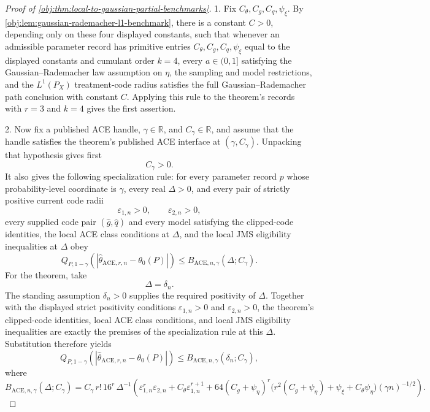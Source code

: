 \begin{proof}[Proof of \cref{obj:thm:local-to-gaussian-partial-benchmarks}]
1.  Fix \(C_{\theta},C_g,C_q,\psi_{\xi}\).  By
\cref{obj:lem:gaussian-rademacher-l1-benchmark}, there is a constant
\(C>0\), depending only on these four displayed constants, such that whenever
an admissible parameter record has primitive entries
\(C_{\theta},C_g,C_q,\psi_{\xi}\) equal to the displayed constants and
cumulant order \(k=4\), every \(a\in(0,1]\) satisfying the
Gaussian--Rademacher law assumption on \(\eta\), the sampling and model
restrictions, and the \(L^1(P_X)\) treatment-code radius satisfies the full
Gaussian--Rademacher path conclusion with constant \(C\).  Applying this rule
to the theorem's records with \(r=3\) and \(k=4\) gives the first assertion. %

2.  Now fix a published ACE handle, \(\gamma\in\mathbb R\), and
\(C_{\gamma}\in\mathbb R\), and assume that the handle satisfies the theorem's
published ACE interface at \((\gamma,C_{\gamma})\).  Unpacking that hypothesis
gives first
\[
C_{\gamma}>0.
\]
It also gives the following specialization rule: for every parameter record
\(p\) whose probability-level coordinate is \(\gamma\), every real
\(\Delta>0\), and every pair of strictly positive current code radii
\[
\varepsilon_{1,n}>0,
\qquad
\varepsilon_{2,n}>0,
\]
every supplied code pair \((\widehat g,\widehat q)\) and every model satisfying
the clipped-code identities, the local ACE class conditions at \(\Delta\), and
the local JMS eligibility inequalities at \(\Delta\) obey
\[
Q_{P,1-\gamma}
\!\left(\left|\widehat\theta_{\mathrm{ACE},r,n}-\theta_0(P)\right|\right)
\le
B_{\mathrm{ACE},n,\gamma}(\Delta;C_{\gamma}).
\]
For the theorem, take
\[
\Delta=\delta_n .
\]
The standing assumption \(\delta_n>0\) supplies the required positivity of
\(\Delta\).  Together with the displayed strict positivity conditions
\(\varepsilon_{1,n}>0\) and \(\varepsilon_{2,n}>0\), the theorem's clipped-code
identities, local ACE class conditions, and local JMS eligibility inequalities
are exactly the premises of the specialization rule at this \(\Delta\).
Substitution therefore yields
\[
Q_{P,1-\gamma}
\!\left(\left|\widehat\theta_{\mathrm{ACE},r,n}-\theta_0(P)\right|\right)
\le
B_{\mathrm{ACE},n,\gamma}(\delta_n;C_{\gamma}),
\]
where
\[
B_{\mathrm{ACE},n,\gamma}(\Delta;C_{\gamma})
=
C_{\gamma}\,r!\,16^r\,\Delta^{-1}
\left(
\varepsilon_{1,n}^r\varepsilon_{2,n}
+C_{\theta}\varepsilon_{1,n}^{r+1}
+64(C_g+\psi_{\eta})^r
\bigl(r^2(C_g+\psi_{\eta})+\psi_{\xi}+C_{\theta}\psi_{\eta}\bigr)
(\gamma n)^{-1/2}
\right).
\]
\end{proof}

